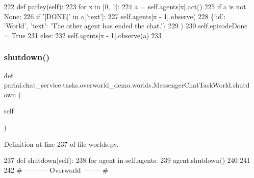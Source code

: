 \begin{DoxyCode}
222     \textcolor{keyword}{def }parley(self):
223         \textcolor{keywordflow}{for} x \textcolor{keywordflow}{in} [0, 1]:
224             a = self.agents[x].act()
225             \textcolor{keywordflow}{if} a \textcolor{keywordflow}{is} \textcolor{keywordflow}{not} \textcolor{keywordtype}{None}:
226                 \textcolor{keywordflow}{if} \textcolor{stringliteral}{'[DONE]'} \textcolor{keywordflow}{in} a[\textcolor{stringliteral}{'text'}]:
227                     self.agents[x - 1].observe(
228                         \{\textcolor{stringliteral}{'id'}: \textcolor{stringliteral}{'World'}, \textcolor{stringliteral}{'text'}: \textcolor{stringliteral}{'The other agent has ended the chat.'}\}
229                     )
230                     self.episodeDone = \textcolor{keyword}{True}
231                 \textcolor{keywordflow}{else}:
232                     self.agents[x - 1].observe(a)
233 
\end{DoxyCode}
\mbox{\label{classparlai_1_1chat__service_1_1tasks_1_1overworld__demo_1_1worlds_1_1MessengerChatTaskWorld_a4a047cbd2ada8c30aabdee9d8452582e}} 
\subsubsection{\texorpdfstring{shutdown()}{shutdown()}}
{\footnotesize\ttfamily def parlai.\+chat\+\_\+service.\+tasks.\+overworld\+\_\+demo.\+worlds.\+Messenger\+Chat\+Task\+World.\+shutdown (\begin{DoxyParamCaption}\item[{}]{self }\end{DoxyParamCaption})}



Definition at line 237 of file worlds.\+py.


\begin{DoxyCode}
237     \textcolor{keyword}{def }shutdown(self):
238         \textcolor{keywordflow}{for} agent \textcolor{keywordflow}{in} self.agents:
239             agent.shutdown()
240 
241 
242 \textcolor{comment}{# ---------- Overworld -------- #}
\end{DoxyCode}


